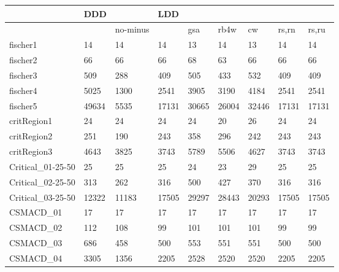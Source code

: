 \begin{table}
\begin{adjustbox}{max totalheight=\textheight}
    \begin{tabular}{|l|ll|llllll|}
    \hline
    ~                  & DDD    & ~        & LDD    & ~      & ~      & ~      & ~      & ~      \\ \hline
    ~                  & ~      & no-minus & ~      & gsa    & rb4w   & cw     & rs,rn  & rs,ru  \\ \hline
    fischer1           & 14     & 14       & 14     & 13     & 14     & 13     & 14     & 14     \\
    fischer2           & 66     & 66       & 66     & 68     & 63     & 66     & 66     & 66     \\
    fischer3           & 509    & 288      & 409    & 505    & 433    & 532    & 409    & 409    \\
    fischer4           & 5025   & 1300     & 2541   & 3905   & 3190   & 4184   & 2541   & 2541   \\
    fischer5           & 49634  & 5535     & 17131  & 30665  & 26004  & 32446  & 17131  & 17131  \\ \hline
    critRegion1        & 24     & 24       & 24     & 24     & 20     & 26     & 24     & 24     \\
    critRegion2        & 251    & 190      & 243    & 358    & 296    & 242    & 243    & 243    \\
    critRegion3        & 4643   & 3825     & 3743   & 5789   & 5506   & 4627   & 3743   & 3743   \\ \hline
    Critical\_01-25-50 & 25     & 25       & 25     & 24     & 23     & 29     & 25     & 25     \\
    Critical\_02-25-50 & 313    & 262      & 316    & 500    & 427    & 370    & 316    & 316    \\
    Critical\_03-25-50 & 12322  & 11183    & 17505  & 29297  & 28443  & 20293  & 17505  & 17505  \\ \hline
    CSMACD\_01         & 17     & 17       & 17     & 17     & 17     & 17     & 17     & 17     \\
    CSMACD\_02         & 112    & 108      & 99     & 101    & 101    & 101    & 99     & 99     \\
    CSMACD\_03         & 686    & 458      & 500    & 553    & 551    & 551    & 500    & 500    \\
    CSMACD\_04         & 3305   & 1356     & 2205   & 2528   & 2520   & 2520   & 2205   & 2205   \\

\end{tabular}
\end{adjustbox}
\end{table}
